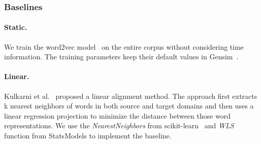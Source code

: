 \begin{table}[htp]
\centering
{}
\caption{Data stats across each temporal and the general domain, where $\#doc$ is the number of documents, $\#uw$ refers to the unique numbers of words in the domain and $\#awpd$ means the average number of words per document.}
\label{chap3:tab:dweEvalData}
\end{table}


\subsubsection{Baselines}
\label{chap3:subsec:dweBaselines}


\paragraph{Static.} 
We train the word2vec model~\cite{mikolov2013distributed} on the entire corpus without considering time information.
The training parameters keep their default values in Gensim~\cite{rehurek2010software}.

\paragraph{Linear.} 
Kulkarni et al.~\cite{kulkarni2015statistically} proposed a linear alignment method. The approach first extracts k nearest neighbors of words in both source and target domains and then uses a linear regression projection to minimize the distance between those word representations. We use the \textit{NearestNeighbors} from scikit-learn~\cite{pedregosa2011scikit} and \textit{WLS} function from StatsModels to implement the baseline.


